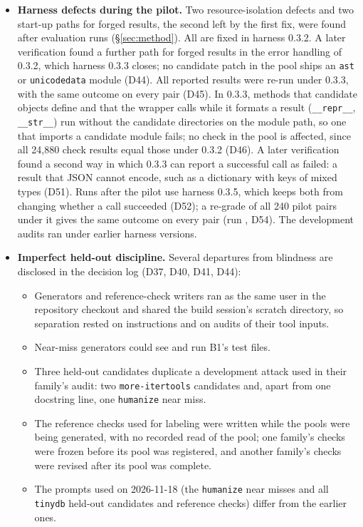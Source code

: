 \begin{itemize}
\item \textbf{Harness defects during the pilot.} Two resource-isolation defects and two start-up paths for forged results, the second left by the first fix, were found after evaluation runs (\S\ref{sec:method}). All are fixed in harness 0.3.2. A later verification found a further path for forged results in the error handling of 0.3.2, which harness 0.3.3 closes; no candidate patch in the pool ships an \texttt{ast} or \texttt{unicodedata} module (D44). All reported results were re-run under 0.3.3, with the same outcome on every pair (D45). In 0.3.3, methods that candidate objects define and that the wrapper calls while it formats a result (\texttt{\_\_repr\_\_}, \texttt{\_\_str\_\_}) run without the candidate directories on the module path, so one that imports a candidate module fails; no check in the pool is affected, since all 24,880 check results equal those under 0.3.2 (D46). A later verification found a second way in which 0.3.3 can report a successful call as failed: a result that JSON cannot encode, such as a dictionary with keys of mixed types (D51). Runs after the pilot use harness 0.3.5, which keeps both from changing whether a call succeeded (D52); a re-grade of all 240 pilot pairs under it gives the same outcome on every pair (run \texttt{\REGRADERUN}, D54). The development audits ran under earlier harness versions.
\item \textbf{Imperfect held-out discipline.} Several departures from blindness are disclosed in the decision log (D37, D40, D41, D44):
\begin{itemize}
\item Generators and reference-check writers ran as the same user in the repository checkout and shared the build session's scratch directory, so separation rested on instructions and on audits of their tool inputs.
\item Near-miss generators could see and run B1's test files.
\item Three held-out candidates duplicate a development attack used in their family's audit: two \texttt{more-itertools} candidates and, apart from one docstring line, one \texttt{humanize} near miss.
\item The reference checks used for labeling were written while the pools were being generated, with no recorded read of the pool; one family's checks were frozen before its pool was registered, and another family's checks were revised after its pool was complete.
\item The prompts used on 2026-11-18 (the \texttt{humanize} near misses and all \texttt{tinydb} held-out candidates and reference checks) differ from the earlier ones.

\end{itemize}
\end{itemize}
